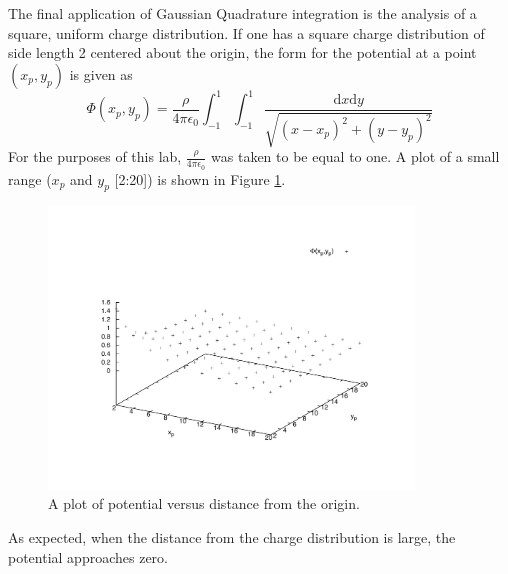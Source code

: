 \documentclass[12pt]{article}
\begin{document}
The final application of Gaussian Quadrature integration is the analysis of a square, uniform charge distribution.  If one has a square charge distribution of side length 2 centered about the origin, the form for the potential at a point $(x_p,y_p)$ is given as 
\begin{equation}
\label{Potential}
\Phi(x_p,y_p) =\frac{\rho}{4\pi\epsilon_0} \int_{-1}^1\int_{-1}^1 \frac{\mathrm{d}x \mathrm{d}y}{\sqrt{(x-x_p)^2+(y-y_p)^2}}
\end{equation}
For the purposes of this lab, $\frac{\rho}{4\pi\epsilon_0}$ was taken to be equal to one.  A plot of a small range ($x_p$ and $y_p$ [2:20]) is shown in Figure \ref{fig:Potential}.
\begin{figure}[!h]
\centering
\includegraphics[width =120 mm, height = 75mm]{Ex_4_22.pdf}
\caption{A plot of potential versus distance from the origin.}
\label{fig:Potential}
\end{figure}
As expected, when the distance from the charge distribution is large, the potential approaches zero.
\end{document}

